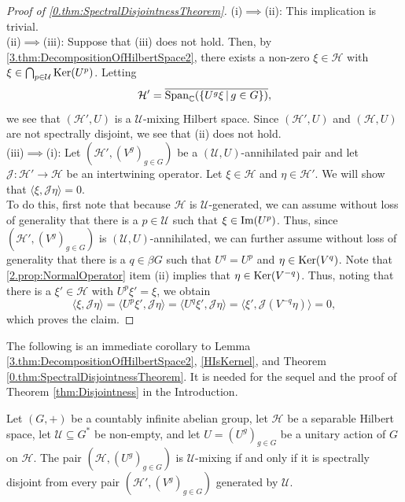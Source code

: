 \documentclass[graybox]{svmult}
\theoremstyle{definition}
\begin{document}
\begin{proof}[Proof of \cref{0.thm:SpectralDisjointnessTheorem}]
(i)$\implies$(ii): This implication is trivial.\\
(ii)$\implies$(iii): Suppose that (iii) does not hold. Then, by \cref{3.thm:DecompositionOfHilbertSpace2}, there exists a non-zero $\xi\in\mathcal H$ with $\xi\in \bigcap_{p\in\mathcal U}\text{{\rm Ker}}(U^p)$. Letting 
$$\mathcal H'=\overline{\text{\rm{Span}}_{\mathbb C}(\{U^g\xi\,|\,g\in G\})},$$
we see that $(\mathcal H',U)$ is a $\mathcal U$-mixing Hilbert space.
Since $(\mathcal H',U)$ and $(\mathcal H,U)$ are not spectrally disjoint, we see that (ii) does not hold.\\
(iii)$\implies$(i): Let $(\mathcal H',(V^g)_{g\in G})$ be a $(\mathcal U,U)$-annihilated pair and let $\mathcal J:\mathcal H'\rightarrow \mathcal H$ be an intertwining operator. 
Let $\xi\in\mathcal H$ and $\eta\in \mathcal H'$.
We will show that $\langle \xi,\mathcal J\eta\rangle=0$.\\
To do this, first note that because $\mathcal H$ is $\mathcal U$-generated, we can assume without loss of generality that there is a $p\in\mathcal U$ such that $\xi\in \text{\rm{Im}}(U^p)$. 
Thus, since $(\mathcal H',(V^g)_{g\in G})$ is $(\mathcal U,U)$-annihilated,  we can further assume without loss of generality that there is a $q\in \beta G$ such that $U^q=U^p$ and $\eta\in \text{{\rm Ker}}(V^q)$. 
Note that \cref{2.prop:NormalOperator} item (ii) implies that $\eta\in\text{{\rm Ker}}(V^{-q})$. Thus, noting that  there is a $\xi' \in \mathcal{H}$ with $U^p\xi'=\xi$, we obtain
$$
\langle \xi,\mathcal J\eta\rangle=\langle U^p\xi',\mathcal J \eta\rangle=\langle U^q\xi',\mathcal J\eta\rangle=\langle \xi',\mathcal J(V^{-q}\eta)\rangle=0,
$$
which proves the claim.
\end{proof}

The following is an immediate corollary to Lemma \ref{3.thm:DecompositionOfHilbertSpace2}, \eqref{HIsKernel}, and Theorem \ref{0.thm:SpectralDisjointnessTheorem}. It is needed for the sequel and the proof of Theorem \ref{thm:Disjointness} in the Introduction.
\begin{corollary}\label{cor:HilbertianUmixingChar}
    Let $(G,+)$ be a countably infinite abelian group, let $\mathcal H$ be a separable Hilbert space, let $\mathcal U\subseteq G^*$ be non-empty, and let $U=(U^g)_{g\in G}$ be a unitary action of $G$ on $\mathcal H$. The pair $(\mathcal H,(U^g)_{g\in G})$ is $\mathcal U$-mixing if and only if it is spectrally disjoint from every pair $(\mathcal H',(V^g)_{g\in G})$ generated by $\mathcal U$.
\end{corollary}
\end{document}

